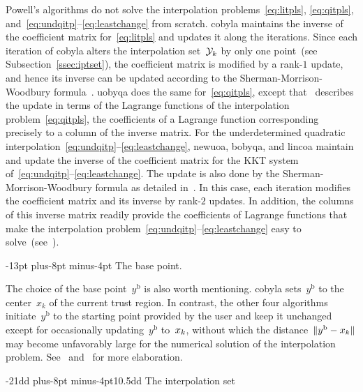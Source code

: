 \documentclass[smallextended]{svjour3}
\makeatletter
\newcommand{\norm}[2][]{#1\lVert#2#1\rVert}
\newcommand{\base}{{\text{b}}}
\newcommand{\iter}[1][k]{x\ifthenelse{\equal{#1}{}}{}{_{#1}}}
\newcommand{\xpt}[1][k]{\mathcal{Y}\ifthenelse{\equal{#1}{}}{}{_{#1}}}
\def\subsubsection{\@startsection{subsubsection}{2}{\z@}%
    {-21dd plus-8pt minus-4pt}{10.5dd}
    {\normalsize\bfseries}}
\def\paragraph{\@startsection{paragraph}{4}{\z@}%
    {-13pt plus-8pt minus-4pt}{\z@}
    {\normalsize\bfseries}}
\makeatother
\begin{document}
Powell's algorithms do not solve the interpolation problems~\eqref{eq:litpls}, \eqref{eq:qitpls}, and~\eqref{eq:undqitp}--\eqref{eq:leastchange} from scratch.
\Gls{cobyla} maintains the inverse of the coefficient matrix for~\eqref{eq:litpls} and updates it along the iterations.
Since each iteration of \gls{cobyla} alters the interpolation set~$\xpt$ by only one point~(see Subsection~\ref{ssec:iptset}), the coefficient matrix is modified by a rank-$1$ update, and hence its inverse can be updated according to the Sherman-Morrison-Woodbury formula~\cite{Hager_1989}.
\Gls{uobyqa} does the same for~\eqref{eq:qitpls}, except that~\cite[\S~4]{Powell_2002} describes the update in terms of the Lagrange functions of the interpolation problem~\eqref{eq:qitpls}, the coefficients of a Lagrange function corresponding precisely to a column of the inverse matrix.
For the underdetermined quadratic interpolation~\eqref{eq:undqitp}--\eqref{eq:leastchange}, \gls{newuoa}, \gls{bobyqa}, and \gls{lincoa} maintain and update the inverse of the coefficient matrix for the KKT system of~\eqref{eq:undqitp}--\eqref{eq:leastchange}.
The update is also done by the Sherman-Morrison-Woodbury formula as detailed in~\cite[\S~2]{Powell_2004c}.
In this case, each iteration modifies the coefficient matrix and its inverse by rank-$2$ updates.
In addition, the columns of this inverse matrix readily provide the coefficients of Lagrange
functions that make the interpolation problem~\eqref{eq:undqitp}--\eqref{eq:leastchange} easy to
solve~(see~\cite[\S~3]{Powell_2004b}).

\paragraph{The base point.}

The choice of the base point~$y^{\base}$ is also worth mentioning.
\Gls{cobyla} sets~$y^{\base}$ to the center~$x_k$ of the current trust region.
In contrast, the other four algorithms initiate~$y^{\base}$ to the starting point provided by the user and keep it unchanged except for occasionally updating~$y^{\base}$ to~$\iter$, without which the distance~$\norm{y^{\base}-\iter}$ may become unfavorably large for the numerical solution of the interpolation problem.
See~\cite[\S~5]{Powell_2004b} and~\cite[\S~7]{Powell_2006} for more elaboration.

\subsubsection{The interpolation set}
\label{ssec:iptset}
\end{document}

